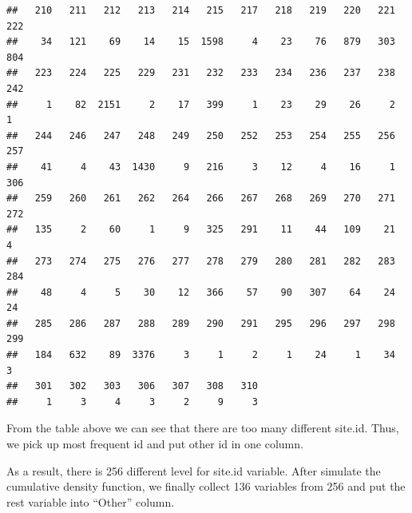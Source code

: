 \documentclass{article}\usepackage[]{graphicx}\usepackage[]{color}
\makeatletter
\newenvironment{kframe}{%
 \def\at@end@of@kframe{}%
 \ifinner\ifhmode%
  \def\at@end@of@kframe{\end{minipage}}%
  \begin{minipage}{\columnwidth}%
 \fi\fi%
 \def\FrameCommand##1{\hskip\@totalleftmargin \hskip-\fboxsep
 \colorbox{shadecolor}{##1}\hskip-\fboxsep
     \hskip-\linewidth \hskip-\@totalleftmargin \hskip\columnwidth}%
 \MakeFramed {\advance\hsize-\width
   \@totalleftmargin\z@ \linewidth\hsize
   \@setminipage}}%
 {\par\unskip\endMakeFramed%
 \at@end@of@kframe}
\newenvironment{knitrout}{}{} %
\makeatother
\begin{document}
\begin{knitrout}
\begin{kframe}
\begin{verbatim}
##   210   211   212   213   214   215   217   218   219   220   221   222 
##    34   121    69    14    15  1598     4    23    76   879   303   804 
##   223   224   225   229   231   232   233   234   236   237   238   242 
##     1    82  2151     2    17   399     1    23    29    26     2     1 
##   244   246   247   248   249   250   252   253   254   255   256   257 
##    41     4    43  1430     9   216     3    12     4    16     1   306 
##   259   260   261   262   264   266   267   268   269   270   271   272 
##   135     2    60     1     9   325   291    11    44   109    21     4 
##   273   274   275   276   277   278   279   280   281   282   283   284 
##    48     4     5    30    12   366    57    90   307    64    24    24 
##   285   286   287   288   289   290   291   295   296   297   298   299 
##   184   632    89  3376     3     1     2     1    24     1    34     3 
##   301   302   303   306   307   308   310 
##     1     3     4     3     2     9     3
\end{verbatim}
\end{kframe}
\end{knitrout}

From the table above we can see that there are too many different site.id. Thus, we pick up most frequent id and put other id in one column.

As a result, there is 256 different level for site.id variable. After simulate the cumulative density function, we finally collect 136 variables from 256 and put the rest variable into ``Other'' column.
\end{document}

